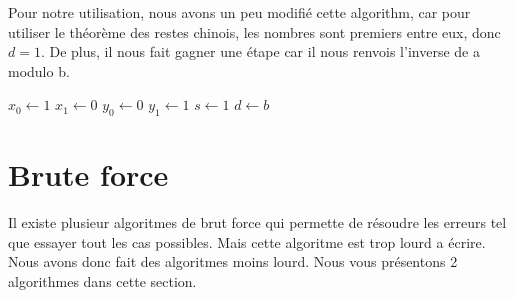 \documentclass[a4paper, 11pt]{article}
\begin{document}
\newline 
Pour notre utilisation, nous avons un peu modifié cette algorithm, car pour utiliser le théorème des restes chinois, les nombres sont premiers entre eux,
donc $d=1$. De plus, il nous fait gagner une étape car il nous renvois l'inverse de a modulo b.
\begin{algorithm}
    $x_0 \leftarrow 1 $ \;
    $x_1 \leftarrow 0 $ \;
    $y_0 \leftarrow 0 $ \;
    $y_1 \leftarrow 1 $ \;
    $s \leftarrow 1 $ \;
    $d \leftarrow b $ \;
\end{algorithm}



\newpage

\section{Brute force}
Il existe plusieur algoritmes de brut force qui permette de résoudre les erreurs tel que essayer tout les cas possibles. Mais cette algoritme est trop lourd a écrire. Nous avons donc fait des algoritmes moins lourd.
Nous vous présentons 2 algorithmes dans cette section.
\end{document}
